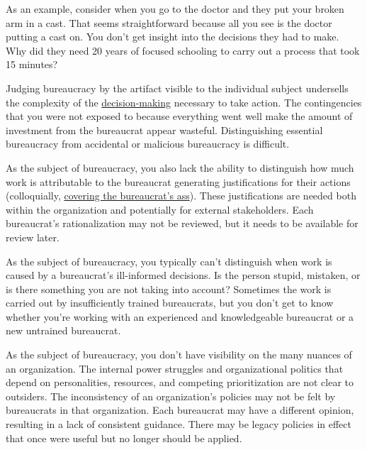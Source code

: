 As an example, consider when you go to the doctor and they put your broken arm in a cast. That seems straightforward because all you see is the doctor putting a cast on. You don't get insight into the decisions they had to make. Why did they need 20 years of focused schooling to carry out a process that took 15 minutes?

Judging bureaucracy by the artifact visible to the individual subject undersells the complexity of the 
\href{https://en.wikipedia.org/wiki/Decision-making}{decision-making}
necessary to take action. The contingencies that you were not exposed to because everything went well make the amount of investment from the bureaucrat appear wasteful. Distinguishing essential bureaucracy from accidental or malicious bureaucracy is difficult.

As the subject of bureaucracy, you also lack the ability to distinguish how much work is attributable to the bureaucrat generating justifications for their actions (colloquially, \href{https://en.wikipedia.org/wiki/Cover_your_ass}{covering the bureaucrat's ass}). 
\iftoggle{WPinmargin}{\marginpar{$>$Wikipedia: Cover your ass}}{ }%
These justifications are needed both within the organization and potentially for external stakeholders. Each bureaucrat's rationalization may not be reviewed, but it needs to be available for review later.

As the subject of bureaucracy, you typically can't distinguish when work is caused by a bureaucrat's ill-informed decisions. Is the person stupid, mistaken, or is there something you are not taking into account?
Sometimes the work is carried out by insufficiently trained bureaucrats, but you don't get to know whether you're working with an experienced and knowledgeable bureaucrat or a new untrained bureaucrat. 

As the subject of bureaucracy, you don't have visibility on the many nuances of an organization. The internal power struggles and organizational politics that depend on personalities, resources, and competing prioritization are not clear to outsiders.
The inconsistency of an organization's policies may not be felt by bureaucrats in that organization. Each bureaucrat may have a different opinion, resulting in a lack of consistent guidance.
There may be legacy policies in effect that once were useful but no longer should be applied.

